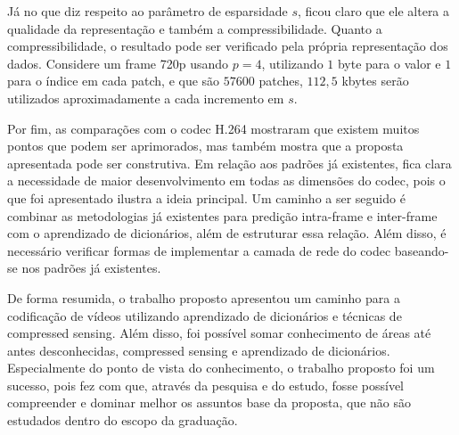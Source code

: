 \documentclass[cic,tc]{iiufrgs}
\begin{document}
Já no que diz respeito ao parâmetro de esparsidade $s$, ficou claro que ele altera a qualidade da representação 
e também a compressibilidade.
Quanto a compressibilidade, o resultado pode ser verificado pela própria representação dos dados.
Considere um frame 720p usando $p=4$, utilizando $1$ byte para o valor e $1$ para o índice em cada 
patch, e que são $57600$ patches, $112,5$ kbytes serão utilizados aproximadamente a cada incremento
em $s$.

Por fim, as comparações com o codec H.264 mostraram que existem muitos pontos que podem ser 
aprimorados, mas também mostra que a proposta apresentada pode ser construtiva.
Em relação aos padrões já existentes, fica clara a necessidade de maior desenvolvimento em 
todas as dimensões do codec, pois o que foi apresentado ilustra a ideia principal.
Um caminho a ser seguido é combinar as metodologias já existentes para predição intra-frame 
e inter-frame com o aprendizado de dicionários, além de estruturar essa relação.
Além disso, é necessário verificar formas de implementar a camada de rede do codec baseando-se 
nos padrões já existentes.

De forma resumida, o trabalho proposto apresentou um caminho para a codificação de vídeos 
utilizando aprendizado de dicionários e técnicas de compressed sensing.
Além disso, foi possível somar conhecimento de áreas até antes desconhecidas, 
compressed sensing e aprendizado de dicionários.
Especialmente do ponto de vista do conhecimento, o trabalho proposto foi um sucesso, 
pois fez com que, através da pesquisa e do estudo, fosse possível compreender e dominar 
melhor os assuntos base da proposta, que não são estudados dentro do escopo da graduação.


% 



\end{document}
